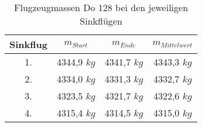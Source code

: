 \begin{table}[h]
	\centering
	\begin{tabular}{|c|c|c|c|}
		\hline
		\textbf{Sinkflug} & \textbf{$m_{Start}$} & \textbf{$m_{Ende}$} & \textbf{$m_{Mittelwert}$} \\ \hline
		1.	& 4344,9 $kg$	& 4341,7 $kg$ & 4343,3 $kg$    \\ \hline
		2.	& 4334,0 $kg$   & 4331,3 $kg$ & 4332,7 $kg$    \\ \hline
		3.	& 4323,5 $kg$	& 4321,7 $kg$ & 4322,6 $kg$	   \\ \hline
		4.  & 4315,4 $kg$	& 4314,5 $kg$ & 4315,0 $kg$    \\ \hline	
	\end{tabular}
	\caption{Flugzeugmassen Do 128 bei den jeweiligen Sinkflügen}
\end{table}
\newpage